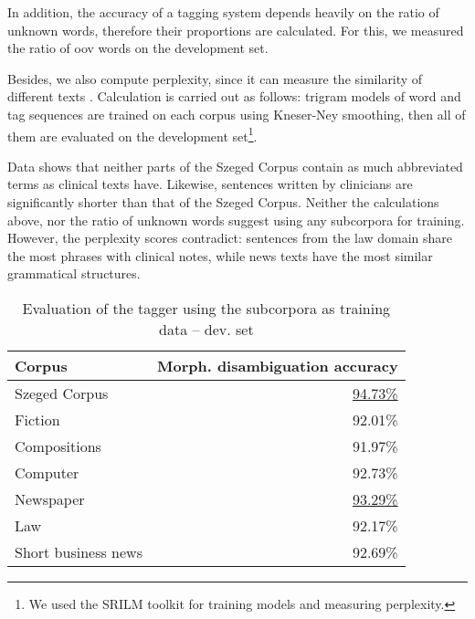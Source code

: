 In addition, the accuracy of a tagging system depends heavily on the ratio of unknown words, therefore their proportions are calculated. 
For this, we measured the ratio of \acrshort{oov} words on the development set. 

Besides, we also compute perplexity, since it can measure the similarity of different texts \cite{kilgarriff1998measures}. 
Calculation is carried out as follows: trigram models of word and tag sequences are trained on each corpus using Kneser-Ney smoothing, then all of them are evaluated on the development set\footnote{We used the SRILM toolkit \cite{stolcke2002srilm} for training models and measuring perplexity.}.

Data shows that neither parts of the Szeged Corpus contain as much abbreviated terms as clinical texts have. 
Likewise, sentences written by clinicians are significantly shorter than that of the Szeged Corpus. 
Neither the calculations above, nor the ratio of unknown words suggest using any subcorpora for training. 
However, the perplexity scores contradict: sentences from the law domain share the most phrases with clinical notes, while news texts have the most similar grammatical structures. 

\begin{table}[H]
\centering
\caption{Evaluation of the tagger using the subcorpora as training data -- dev. set}
\label{tab:eval_subcorpora}
\begin{tabular}{ l r } 
\hline
Corpus & Morph. disambiguation accuracy \\
\hline
Szeged Corpus & \underline{94.73\%} \\
\hspace{0.2cm} Fiction & 92.01\% \\
\hspace{0.2cm} Compositions & 91.97\% \\
\hspace{0.2cm} Computer & 92.73\% \\
\hspace{0.2cm} Newspaper & \underline{93.29\%} \\
\hspace{0.2cm} Law & 92.17\% \\
\hspace{0.2cm} Short business news & 92.69\% \\
\hline
\end{tabular}
\end{table}


